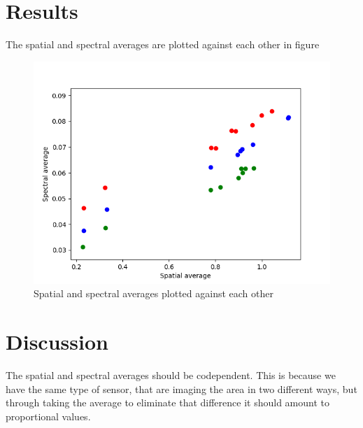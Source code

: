 \section{Results}

The spatial and spectral averages are plotted against each other in figure 
\begin{figure}[h]
    \centering
    \includegraphics[width=1\textwidth]{Plots/spectral_vs_spatial_average.png}
    \caption{Spatial and spectral averages plotted against each other}
    \label{fig:spectral_vs_spatial_values}
\end{figure}



\section{Discussion}
The spatial and spectral averages should be codependent. This is because we have the same type of sensor, that are imaging the area in two different ways, but through taking the average to eliminate that difference it should amount to proportional values. 
